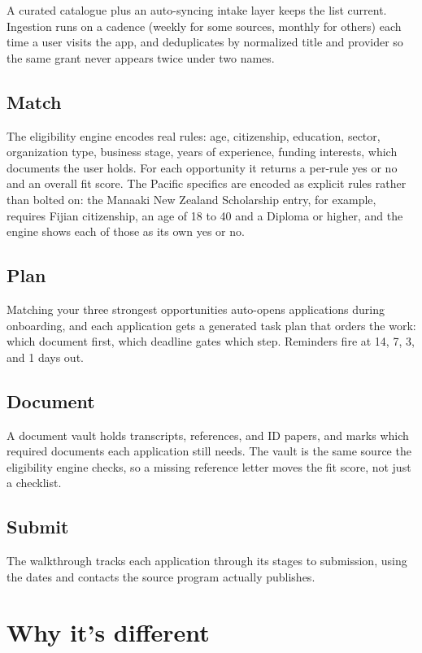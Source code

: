 \documentclass[11pt]{article}
\begin{document}
A curated catalogue plus an auto-syncing intake layer keeps the list current. Ingestion runs on a cadence (weekly for some sources, monthly for others) each time a user visits the app, and deduplicates by normalized title and provider so the same grant never appears twice under two names.

\subsection{Match}

The eligibility engine encodes real rules: age, citizenship, education, sector, organization type, business stage, years of experience, funding interests, which documents the user holds. For each opportunity it returns a per-rule yes or no and an overall fit score. The Pacific specifics are encoded as explicit rules rather than bolted on: the Manaaki New Zealand Scholarship entry, for example, requires Fijian citizenship, an age of 18 to 40 and a Diploma or higher, and the engine shows each of those as its own yes or no.

\subsection{Plan}

Matching your three strongest opportunities auto-opens applications during onboarding, and each application gets a generated task plan that orders the work: which document first, which deadline gates which step. Reminders fire at 14, 7, 3, and 1 days out.

\subsection{Document}

A document vault holds transcripts, references, and ID papers, and marks which required documents each application still needs. The vault is the same source the eligibility engine checks, so a missing reference letter moves the fit score, not just a checklist.

\subsection{Submit}

The walkthrough tracks each application through its stages to submission, using the dates and contacts the source program actually publishes.

\section{Why it's different}
\end{document}

